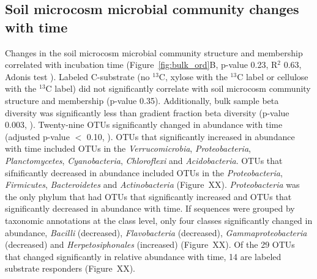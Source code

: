 \subsection{Soil microcosm microbial community changes with time}
Changes in the soil microcosm microbial community structure and membership
correlated with incubation time (Figure~\ref{fig:bulk_ord}B, p-value 0.23,
R$^{2}$ 0.63, Adonis test \citet{Anderson2001a}). Labeled C-substrate (no
$^{13}$C, xylose with the $^{13}$C label or cellulose with the
$^{13}$C label) did not significantly correlate with soil microcosm community
structure and membership (p-value 0.35). Additionally, bulk sample beta
diversity was significantly less than gradient fraction beta diversity (p-value
0.003, \citet{Anderson2006}). Twenty-nine OTUs significantly changed in
abundance with time (adjusted p-value $<$ 0.10, \citet{YBenjamini1995}). OTUs
that significantly increased in abundance with time included OTUs in the
\textit{Verrucomicrobia}, \textit{Proteobacteria}, \textit{Planctomycetes},
\textit{Cyanobacteria}, \textit{Chloroflexi} and \textit{Acidobacteria}. OTUs
that sifnificantly decreased in abundance included OTUs in the
\textit{Proteobacteria}, \textit{Firmicutes}, \textit{Bacteroidetes} and
\textit{Actinobacteria} (Figure~XX).  \textit{Proteobacteria} was the only
phylum that had OTUs that significantly increased and OTUs that significantly
decreased in abundance with time. If sequences were grouped by taxonomic
annotations at the class level, only four classes significantly changed in
abundance, \textit{Bacilli} (decreased), \textit{Flavobacteria} (decreased),
\textit{Gammaproteobacteria} (decreased) and \textit{Herpetosiphonales}
(increased) (Figure~XX). Of the 29 OTUs that changed significantly in relative
abundance with time, 14 are labeled substrate responders (Figure~XX).
